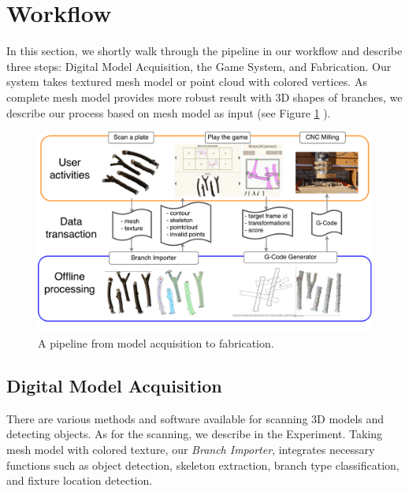 \section{Workflow}
In this section, we shortly walk through the pipeline in our workflow and describe three steps: Digital Model Acquisition, the Game System, and Fabrication. Our system takes textured mesh model or point cloud with colored vertices. As complete mesh model provides more robust result with 3D shapes of branches, we describe our process based on mesh model as input (see Figure \ref{fig:pipeline} ).

\begin{figure}[ht]
  \begin{center}
    \includegraphics[width = 0.4\paperwidth]{images/workflow/pipeline.pdf}
    \caption{A pipeline from model acquisition to fabrication.}
    \label{fig:pipeline}
  \end{center}
\end{figure}

\subsection{Digital Model Acquisition}
There are various methods and software available for scanning 3D models and detecting objects.
As for the scanning, we describe in the Experiment.
Taking mesh model with colored texture, our \textit{Branch Importer}, integrates necessary functions such as object detection, skeleton extraction, branch type classification, and fixture location detection.


